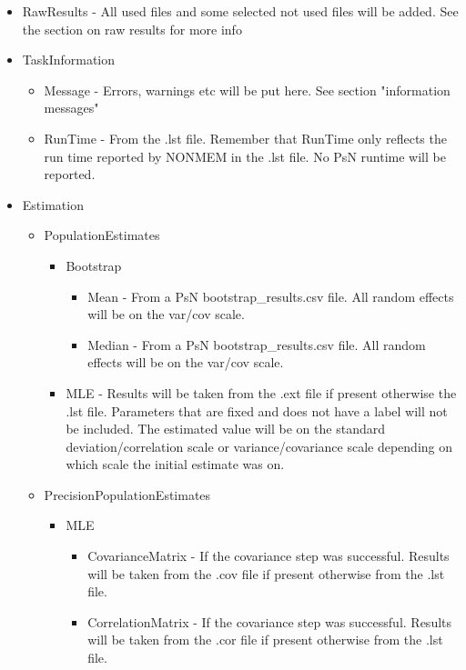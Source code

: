 \begin{itemize}
    \item RawResults - All used files and some selected not used files will be added. See the section on raw results for more info
    \item TaskInformation 
        \begin{itemize}
            \item Message - Errors, warnings etc will be put here. See section "information messages"
            \item RunTime - From the .lst file. Remember that RunTime only reflects the run time reported by NONMEM in the .lst file. No PsN runtime will be reported.
        \end{itemize}
    \item Estimation
        \begin{itemize}
            \item PopulationEstimates
            \begin{itemize}
                \item Bootstrap
                \begin{itemize}
                    \item Mean - From a PsN bootstrap\_results.csv file. All random effects will be on the var/cov scale.
                    \item Median - From a PsN bootstrap\_results.csv file. All random effects will be on the var/cov scale.
                \end{itemize}
                \item MLE - Results will be taken from the .ext file if present otherwise the .lst file. Parameters that are fixed and does not have a label will not be included. The estimated value
                    will be on the standard deviation/correlation scale or variance/covariance scale depending on which scale the initial estimate was on. 
            \end{itemize}
            \item PrecisionPopulationEstimates
            \begin{itemize}
                \item MLE
                \begin{itemize}
                    \item CovarianceMatrix - If the covariance step was successful. Results will be taken from the .cov file if present otherwise from the .lst file.
                    \item CorrelationMatrix - If the covariance step was successful. Results will be taken from the .cor file if present otherwise from the .lst file.

\end{itemize}
\end{itemize}
\end{itemize}
\end{itemize}
